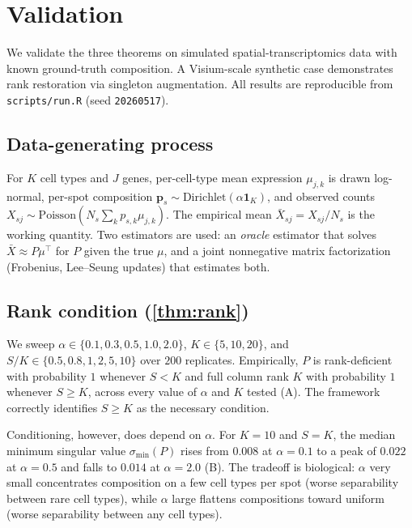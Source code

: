 \section{Validation}
\label{sec:validation}

We validate the three theorems on simulated spatial-transcriptomics
data with known ground-truth composition. A Visium-scale synthetic
case demonstrates rank restoration via singleton augmentation. All
results are reproducible from \texttt{scripts/run.R} (seed
\texttt{20260517}).

\subsection{Data-generating process}

For $K$ cell types and $J$ genes, per-cell-type mean expression
$\mu_{j,k}$ is drawn log-normal, per-spot composition
$\bm{p}_s \sim \mathrm{Dirichlet}(\alpha \bm{1}_K)$, and observed
counts $X_{sj} \sim \mathrm{Poisson}(N_s \sum_k p_{s,k} \mu_{j,k})$.
The empirical mean $\bar{X}_{sj} = X_{sj}/N_s$ is the working
quantity. Two estimators are used: an \emph{oracle} estimator that
solves $\bar{X} \approx P \mu^\top$ for $P$ given the true $\mu$, and
a joint nonnegative matrix factorization (Frobenius, Lee--Seung
updates) that estimates both.

\subsection{Rank condition (\cref{thm:rank})}

We sweep $\alpha \in \{0.1, 0.3, 0.5, 1.0, 2.0\}$, $K \in \{5, 10,
20\}$, and $S/K \in \{0.5, 0.8, 1, 2, 5, 10\}$ over $200$ replicates.
Empirically, $P$ is rank-deficient with probability $1$ whenever
$S < K$ and full column rank $K$ with probability $1$ whenever
$S \geq K$, across every value of $\alpha$ and $K$ tested
(A). The framework correctly identifies
$S \geq K$ as the necessary condition.

Conditioning, however, does depend on $\alpha$. For $K = 10$ and
$S = K$, the median minimum singular value $\sigma_{\min}(P)$ rises
from $0.008$ at $\alpha = 0.1$ to a peak of $0.022$ at $\alpha = 0.5$
and falls to $0.014$ at $\alpha = 2.0$ (B). The
tradeoff is biological: $\alpha$ very small concentrates composition
on a few cell types per spot (worse separability between rare cell
types), while $\alpha$ large flattens compositions toward uniform
(worse separability between any cell types).

